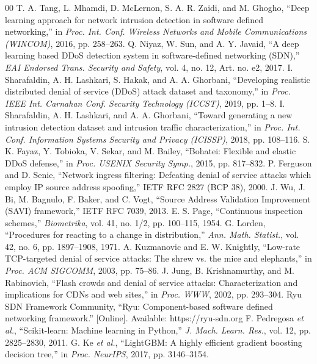 \documentclass[conference]{IEEEtran}
\begin{document}
\begin{thebibliography}{00}
 T. A. Tang, L. Mhamdi, D. McLernon, S. A. R. Zaidi, and M. Ghogho, ``Deep learning approach for network intrusion detection in software defined networking,'' in \emph{Proc. Int. Conf. Wireless Networks and Mobile Communications (WINCOM)}, 2016, pp. 258--263.
 Q. Niyaz, W. Sun, and A. Y. Javaid, ``A deep learning based DDoS detection system in software-defined networking (SDN),'' \emph{EAI Endorsed Trans. Security and Safety}, vol. 4, no. 12, Art. no. e2, 2017.
 I. Sharafaldin, A. H. Lashkari, S. Hakak, and A. A. Ghorbani, ``Developing realistic distributed denial of service (DDoS) attack dataset and taxonomy,'' in \emph{Proc. IEEE Int. Carnahan Conf. Security Technology (ICCST)}, 2019, pp. 1--8.
 I. Sharafaldin, A. H. Lashkari, and A. A. Ghorbani, ``Toward generating a new intrusion detection dataset and intrusion traffic characterization,'' in \emph{Proc. Int. Conf. Information Systems Security and Privacy (ICISSP)}, 2018, pp. 108--116.
 S. K. Fayaz, Y. Tobioka, V. Sekar, and M. Bailey, ``Bohatei: Flexible and elastic DDoS defense,'' in \emph{Proc. USENIX Security Symp.}, 2015, pp. 817--832.
 P. Ferguson and D. Senie, ``Network ingress filtering: Defeating denial of service attacks which employ IP source address spoofing,'' IETF RFC 2827 (BCP 38), 2000.
 J. Wu, J. Bi, M. Bagnulo, F. Baker, and C. Vogt, ``Source Address Validation Improvement (SAVI) framework,'' IETF RFC 7039, 2013.
 E. S. Page, ``Continuous inspection schemes,'' \emph{Biometrika}, vol. 41, no. 1/2, pp. 100--115, 1954.
 G. Lorden, ``Procedures for reacting to a change in distribution,'' \emph{Ann. Math. Statist.}, vol. 42, no. 6, pp. 1897--1908, 1971.
 A. Kuzmanovic and E. W. Knightly, ``Low-rate TCP-targeted denial of service attacks: The shrew vs. the mice and elephants,'' in \emph{Proc. ACM SIGCOMM}, 2003, pp. 75--86.
 J. Jung, B. Krishnamurthy, and M. Rabinovich, ``Flash crowds and denial of service attacks: Characterization and implications for CDNs and web sites,'' in \emph{Proc. WWW}, 2002, pp. 293--304.
 Ryu SDN Framework Community, ``Ryu: Component-based software defined networking framework.'' [Online]. Available: https://ryu-sdn.org
 F. Pedregosa \emph{et al.}, ``Scikit-learn: Machine learning in Python,'' \emph{J. Mach. Learn. Res.}, vol. 12, pp. 2825--2830, 2011.
 G. Ke \emph{et al.}, ``LightGBM: A highly efficient gradient boosting decision tree,'' in \emph{Proc. NeurIPS}, 2017, pp. 3146--3154.

\end{thebibliography}
\end{document}
